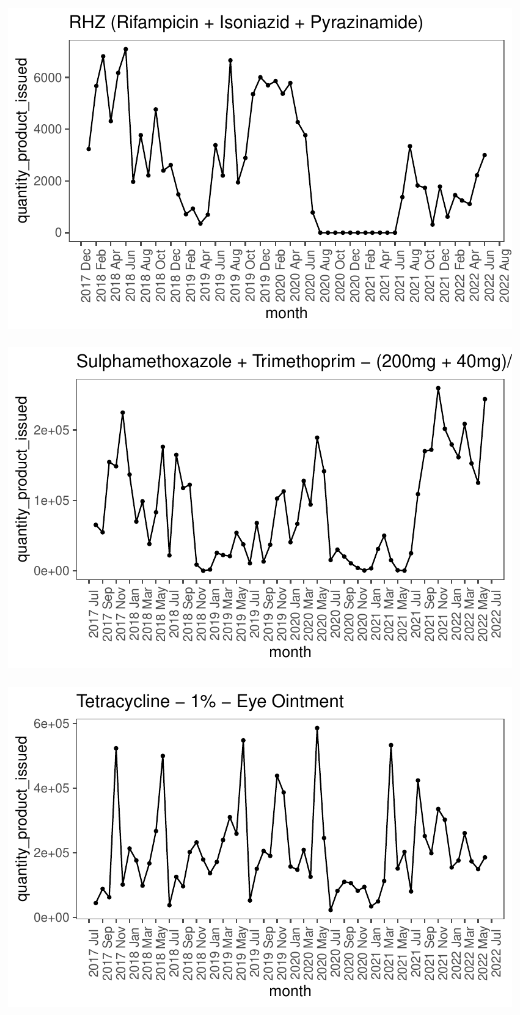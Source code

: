 \documentclass[
  authoryear,
  preprint,
  3p]{elsarticle}
\begin{document}
\includegraphics{main_files/figure-pdf/unnamed-chunk-25-1.pdf}

\includegraphics{main_files/figure-pdf/unnamed-chunk-26-1.pdf}

\includegraphics{main_files/figure-pdf/unnamed-chunk-27-1.pdf}
\end{document}
